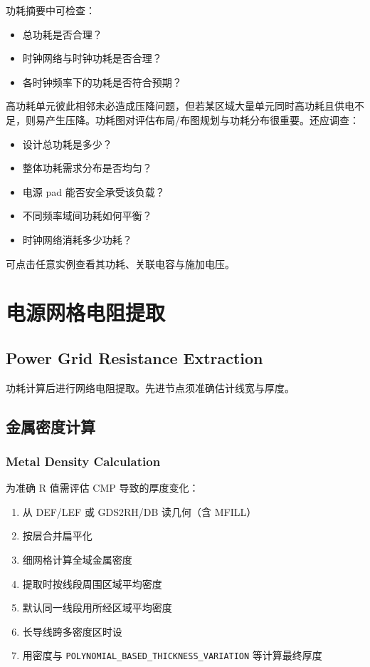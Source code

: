 \label{fig:pw-summary}

功耗摘要中可检查：
\begin{itemize}
  \item 总功耗是否合理？
  \item 时钟网络与时钟功耗是否合理？
  \item 各时钟频率下的功耗是否符合预期？
\end{itemize}
高功耗单元彼此相邻未必造成压降问题，但若某区域大量单元同时高功耗且供电不足，则易产生压降。功耗图对评估布局/布图规划与功耗分布很重要。还应调查：
\begin{itemize}
  \item 设计总功耗是多少？
  \item 整体功耗需求分布是否均匀？
  \item 电源 pad 能否安全承受该负载？
  \item 不同频率域间功耗如何平衡？
  \item 时钟网络消耗多少功耗？
\end{itemize}

可点击任意实例查看其功耗、关联电容与施加电压。

\section{电源网格电阻提取}
\subsection*{Power Grid Resistance Extraction}

功耗计算后进行网络电阻提取。先进节点须准确估计线宽与厚度。

\subsection{金属密度计算}
\subsubsection*{Metal Density Calculation}

为准确 R 值需评估 CMP 导致的厚度变化：
\begin{enumerate}
  \item 从 DEF/LEF 或 GDS2RH/DB 读几何（含 MFILL）
  \item 按层合并扁平化
  \item 细网格计算全域金属密度
  \item 提取时按线段周围区域平均密度
  \item 默认同一线段用所经区域平均密度
  \item 长导线跨多密度区时设 
  \item 用密度与 \texttt{POLYNOMIAL\_BASED\_THICKNESS\_VARIATION} 等计算最终厚度
\end{enumerate}

